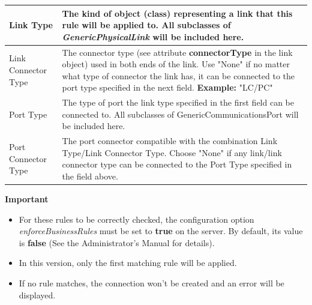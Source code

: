 \documentclass[a4paper]{article}
\begin{document}
\begin{appendices}
			\begin{table}[h!]
				\begin{tabular}{p{5cm}p{10cm}}
					\toprule
					Link Type & 
					The kind of object (class) representing a link that this rule will be applied to. All subclasses of \textit{GenericPhysicalLink} will be included here.\\
					\midrule
					Link Connector Type & The connector type (see attribute \textbf{connectorType} in the link object) used in both ends of the link. Use "None" if no matter what type of connector the link has, it can be connected to the port type specified in the next field. \textbf{Example:} "LC/PC"\\
					\midrule
					Port Type & The type of port the link type specified in the first field can be connected to. All subclasses of GenericCommunicationsPort will be included here. \\
					\midrule
					Port Connector Type & The port connector compatible with the combination Link Type/Link Connector Type. Choose "None" if any link/link connector type can be connected to the Port Type specified in the field above.\\
					\bottomrule	
				\end{tabular}
				
			\end{table}
			
			\begin{framed} {\large \textbf{Important}}
				\begin{itemize}
					\item For these rules to be correctly checked, the configuration option \textit{enforceBusinessRules} must be set to \textbf{true} on the server. By default, its value is \textbf{false} (See the Administrator's Manual for details).
					\item In this version, only the first matching rule will be applied.
					\item If no rule matches, the connection won't be created and an error will be displayed.
				\end{itemize}
			\end{framed}
			
		\end{appendices}				
\end{document}
